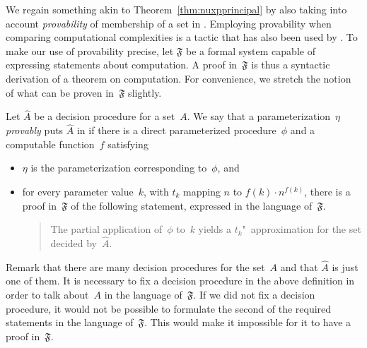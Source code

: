 We regain something akin to Theorem~\ref{thm:nuxpprincipal} by also taking into account \emph{provability} of membership of a set in .
Employing provability when comparing computational complexities is a tactic that has also been used by \textcite{hartmanis1979relations}.
To make our use of provability precise, let $\mathfrak{F}$ be a formal system capable of expressing statements about computation.
A proof in~$\mathfrak{F}$ is thus a syntactic derivation of a theorem on computation.
For convenience, we stretch the notion of what can be proven in~$\mathfrak{F}$ slightly.
\begin{definition}
\label{def:provably}%
  Let $\hat{A}$ be a decision procedure for a set~$A$.
  We say that a parameterization~$\eta$ \emph{provably} puts $\hat{A}$ in  if there is a direct parameterized procedure~$\phi$ and a computable function~$f$ satisfying
  \begin{itemize}
  \item $\eta$ is the parameterization corresponding to~$\phi$, and
  \item for every parameter value~$k$, with $t_k$ mapping $n$ to $f(k) \cdot n^{f(k)}$, there is a proof in~$\mathfrak{F}$ of the following statement, expressed in the language of~$\mathfrak{F}$.
    \begin{quote}
      The partial application of~$\phi$ to~$k$ yields a $t_k$"~approximation for the set decided by~$\hat{A}$.
    \end{quote}
  \end{itemize}
\end{definition}

Remark that there are many decision procedures for the set~$A$ and that $\hat{A}$ is just one of them.
It is necessary to fix a decision procedure in the above definition in order to talk about~$A$ in the language of~$\mathfrak{F}$.
If we did not fix a decision procedure, it would not be possible to formulate the second of the required statements in the language of~$\mathfrak{F}$.
This would make it impossible for it to have a proof in~$\mathfrak{F}$.

